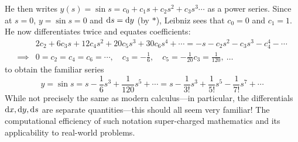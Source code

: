 
He then writes $y(s)=\sin s=c_0+c_1s+c_2s^2+c_3s^3\cdots$ as a power series. Since at $s=0$, $y=\sin s=0$ and ${\mathrm{d} s}={\mathrm{d} y}$ (by $\ast$), Leibniz sees that $c_0=0$ and $c_1=1$. He now differentiates twice and equates coefficients:
\begin{align*}
	&2c_2+6c_3s+12c_4s^2+20c_5s^3+30c_6s^4+\cdots =-s-c_2s^2-c_3s^3-c_4^4-\cdots\\
	\implies &0=c_2=c_4=c_6=\cdots,\quad c_3=-\frac 16,\quad c_5=-\frac 1{20}c_3=\frac 1{120},\ \ldots 
\end{align*}
to obtain the familiar series
\[
	y=\sin s=s-\frac 16s^3+\frac 1{120}s^5+\cdots =s-\frac 1{3!}s^3+\frac 1{5!}s^5-\frac 1{7!}s^7+ \cdots
\]
While not precisely the same as modern calculus---in particular, the differentials ${\mathrm{d} x},{\mathrm{d} y},{\mathrm{d} s}$ are separate quantities---this should all seem very familiar! The computational efficiency of such notation super-charged mathematics and its applicability to real-world problems.

\goodbreak

